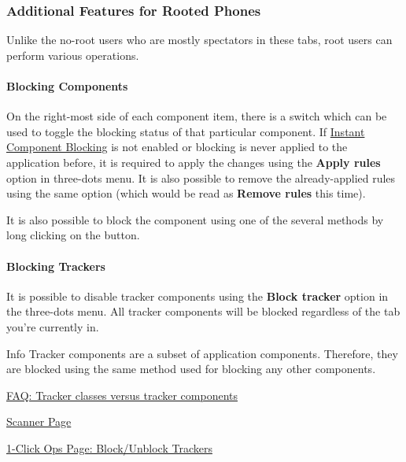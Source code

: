 \subsubsection{Additional Features for Rooted Phones} %
Unlike the no-root users who are mostly spectators in these tabs, root users can perform various operations.

\paragraph{Blocking Components} %
On the right-most side of each component item, there is a switch which can be used to toggle the blocking status of that
particular component. If \hyperref[subsubsec:instant-component-blocking]{Instant Component Blocking} is not enabled or
blocking is never applied to the application before, it is required to apply the changes using the \textbf{Apply rules}
option in three-dots menu. It is also possible to remove the already-applied rules using the same option (which would be
read as \textbf{Remove rules} this time).

It is also possible to block the component using one of the several methods by long clicking on the button.


\paragraph{Blocking Trackers}\label{par:appdetails:blocking-trackers} %
It is possible to disable tracker components using the \textbf{Block tracker} option in the three-dots menu. All tracker
components will be blocked regardless of the tab you're currently in.

\begin{tip}{Info}
    Tracker components are a subset of application components. Therefore, they are blocked using the same method used
    for blocking any other components.
\end{tip}

\begin{amseealso}
    \item \hyperref[subsec:tracker-classes-versus-tracker-components]{FAQ: Tracker classes versus tracker components}
    \item \hyperref[sec:scanner-page]{Scanner Page}
    \item \hyperref[subsec:block-unblock-trackers]{1-Click Ops Page: Block/Unblock Trackers}
\end{amseealso}

